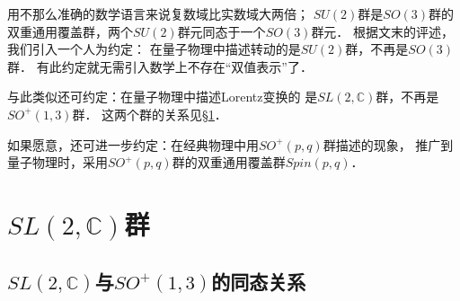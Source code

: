 用不那么准确的数学语言来说复数域比实数域大两倍；
$SU(2)$群是$SO(3)$群的双重通用覆盖群，两个$SU(2)$群元同态于一个$SO(3)$群元．
根据\textcite[\S 2.7]{weinberg_vol1}文末的评述，
我们引入一个人为约定：
{\kaishu 在量子物理中描述转动的是$SU(2)$群，不再是$SO(3)$群．}
有此约定就无需引入数学上不存在“双值表示”了．

与此类似还可约定：{\kaishu 在量子物理中描述Lorentz变换的
    是$SL(2,\mathbb{C})$群，不再是$SO^{+}(1,3)$群．}
这两个群的关系见\S\ref{chlar:sec_SL2C}．

如果愿意，还可进一步约定：{\kaishu 在经典物理中用$SO^{+}(p,q)$群描述的现象，
推广到量子物理时，采用$SO^{+}(p,q)$群的双重通用覆盖群$Spin(p,q)$．}



\section{$SL(2,\mathbb{C})$群}\label{chlar:sec_SL2C}



\subsection{$SL(2,\mathbb{C})$与$SO^{+}(1,3)$的同态关系} \label{chlar:sec_slsoh}


